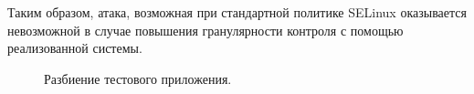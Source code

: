 

Таким образом, атака, возможная при стандартной политике SELinux оказывается
невозможной в случае повышения гранулярности контроля с помощью реализованной
системы.

\begin{figure}
\centering
\subfloat{\label{fig:selinux}{}}
\caption{Разбиение тестового приложения.}
\end{figure}

\begin{comment}

\subsection{Выделение некоторого набора адресов 
		контрольных точек из программы}

Контрольной точкой является некоторый адрес 
в виртуальном адресном пространстве процесса.
Попадание исполнения на контрольную точку 
сигнализирует наблюдающей системе об изменении 
внутреннего состояния наблюдаемого процесса. 

Ставится задача определения адресов контрольных точек 
в наблюдаемом процессе. 

В работе прошлого года предполагалось выделение 
контрольных точек при наличии исходных текстов 
наблюдаемого приложения на языках C/C++ и
информации о том, 
с какими параметрами приложение было собрано.
На этапе подготовки экспертом расставляются 
контрольные точки в исходных текстах приложения. 
При сборке адреса данных контрольных точек 
компонуются в отдельную секцию в исполняемом 
файле приложения. 

Данные адреса связываются с определенной информацией 
в текстовом формате, которая описывается в конфигурационном файле.
Информация, описанная в конфигурационном файле 
определяет работу наблюдающей системы.

В этом году было решено добавить возможность работы 
без необходимости в исходных текстах наблюдаемого 
приложения, а также без необходимости пересборки 
и добавления новой секции с адресами в исполняемый 
файл приложения.

Данный подход позволяет расширить класс приложений, 
наблюдение за поведением которых возможно, до всех 
приложений, работающих в нативном коде. Кроме этого, 
наличие исходных текстов наблюдаемых приложений 
перестает быть необходимым условием.


\end{comment}
